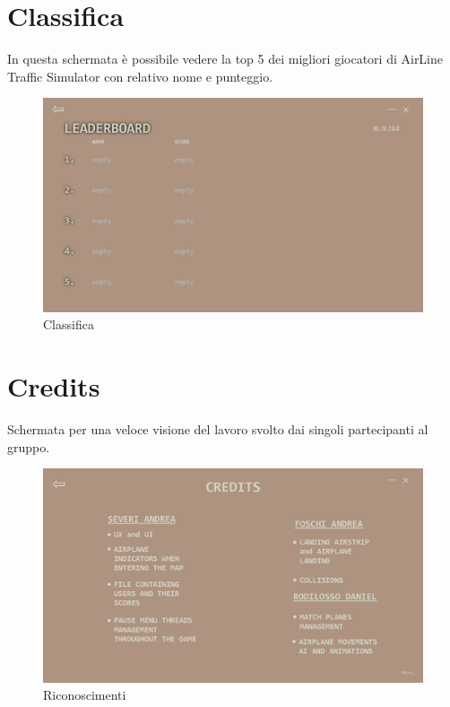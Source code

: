 \documentclass[a4paper,12pt]{report}
\begin{document}
\clearpage

\section*{Classifica}
In questa schermata è possibile vedere la top 5 dei migliori giocatori di AirLine Traffic Simulator con relativo nome e punteggio.
\begin{figure}[H]
    \begin{center}
        \centering
        \includegraphics[width=\textwidth]{img/GuidaUtente/Leaderboard.png}
    \end{center}
    \caption{Classifica}
    \label{img:leaderboard-png}
\end{figure}

\clearpage

\section*{Credits}
Schermata per una veloce visione del lavoro svolto dai singoli partecipanti al gruppo.
\begin{figure}[H]
    \begin{center}
        \centering
        \includegraphics[width=\textwidth]{img/GuidaUtente/Credits.png}
    \end{center}
    \caption{Riconoscimenti}
    \label{img:credits}
\end{figure}
\end{document}
